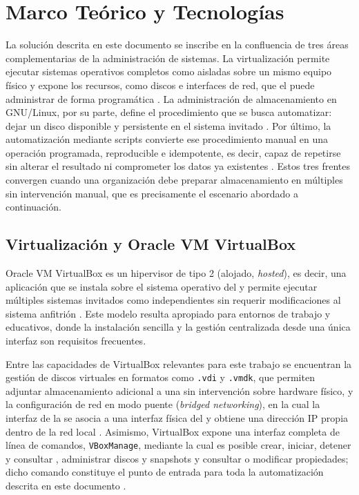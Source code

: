 \section{Marco Teórico y Tecnologías}

La solución descrita en este documento se inscribe en la confluencia de tres áreas complementarias de la administración de sistemas. La virtualización permite ejecutar sistemas operativos completos como \vm{} aisladas sobre un mismo equipo físico y expone los recursos, como discos e interfaces de red, que el \host{} puede administrar de forma programática \parencite{virtualbox_vboxmanage, virtualbox_networking}. La administración de almacenamiento en GNU/Linux, por su parte, define el procedimiento que se busca automatizar: dejar un disco disponible y persistente en el sistema invitado \parencite{linux_storage_management}. Por último, la automatización mediante scripts convierte ese procedimiento manual en una operación programada, reproducible e idempotente, es decir, capaz de repetirse sin alterar el resultado ni comprometer los datos ya existentes \parencite{idempotency_concept}. Estos tres frentes convergen cuando una organización debe preparar almacenamiento en múltiples \vm{} sin intervención manual, que es precisamente el escenario abordado a continuación.

\subsection{Virtualización y Oracle VM VirtualBox}

Oracle VM VirtualBox es un hipervisor de tipo 2 (alojado, \textit{hosted}), es decir, una aplicación que se instala sobre el sistema operativo del \host{} y permite ejecutar múltiples sistemas invitados como \vm{} independientes sin requerir modificaciones al sistema anfitrión \parencite{virtualbox_vboxmanage}. Este modelo resulta apropiado para entornos de trabajo y educativos, donde la instalación sencilla y la gestión centralizada desde una única interfaz son requisitos frecuentes.

Entre las capacidades de VirtualBox relevantes para este trabajo se encuentran la gestión de discos virtuales en formatos como \texttt{.vdi} y \texttt{.vmdk}, que permiten adjuntar almacenamiento adicional a una \vm{} sin intervención sobre hardware físico, y la configuración de red en modo puente (\textit{bridged networking}), en la cual la interfaz de la \vm{} se asocia a una interfaz física del \host{} y obtiene una dirección IP propia dentro de la red local \parencite{virtualbox_networking}. Asimismo, VirtualBox expone una interfaz completa de línea de comandos, \texttt{VBoxManage}, mediante la cual es posible crear, iniciar, detener y consultar \vm{}, administrar discos y snapshots y consultar o modificar propiedades; dicho comando constituye el punto de entrada para toda la automatización descrita en este documento \parencite{virtualbox_vboxmanage}.


